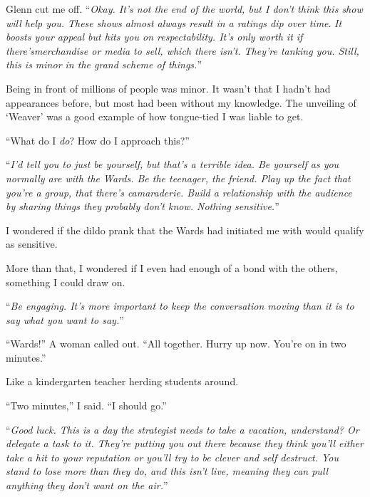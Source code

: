 Glenn cut me off.  ``\emph{Okay.  It's not the end of the world, but I don't think this show will help you.  These shows almost always result in a ratings dip over time}.  \emph{It boosts your appeal but hits you on respectability.  It's only worth it if there's}\emph{merchandise or media to sell, which there isn't.  They're tanking you.  Still, this is minor in the grand scheme of things.}''



Being in front of millions of people was minor.  It wasn't that I hadn't had appearances before, but most had been without my knowledge.  The unveiling of `Weaver' was a good example of how tongue-tied I was liable to get.



``What do I \emph{do}?  How do I approach this?''



``\emph{I'd tell you to just be yourself, but that's a terrible idea.  Be yourself as you normally are with the Wards.  Be the teenager, the friend.  Play up the fact that you're a group, that there's camaraderie.  Build a relationship with the audience by sharing things they probably don't know.  Nothing sensitive.}''



I wondered if the dildo prank that the Wards had initiated me with would qualify as sensitive.



More than that, I wondered if I even had enough of a bond with the others, something I could draw on.



``\emph{Be engaging.  It's more important to keep the conversation moving than it is to say what you want to say.}''



``Wards!''  A woman called out.  ``All together.  Hurry up now.  You're on in two minutes.''



Like a kindergarten teacher herding students around.



``Two minutes,'' I said.  ``I should go.''



``\emph{Good luck.  This is a day the strategist needs to take a vacation, understand?  Or delegate a task to it.  They're putting you out there because they think you'll either take a hit to your reputation or you'll try to be clever and self destruct.  You stand to lose more than they do, and this isn't live, meaning they can pull anything they don't want on the air.}''



